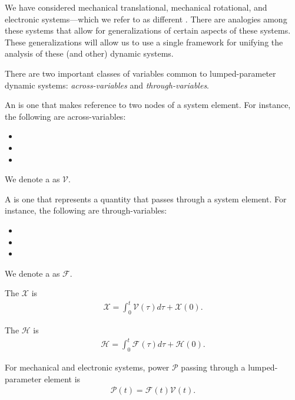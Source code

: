\documentclass[dynamic_systems.tex]{subfiles}
\begin{document}
We have considered mechanical translational, mechanical rotational, and electronic systems---which we refer to as different .
There are analogies among these systems that allow for generalizations of certain aspects of these systems.
These generalizations will allow us to use a single framework for unifying the analysis of these (and other) dynamic systems.
\tags{}

There are two important classes of variables common to lumped-parameter dynamic systems: \emph{across-variables} and \emph{through-variables}.
\tags{}

An  is one that makes reference to two nodes of a system element.
For instance, the following are across-variables:
\tags{}

\begin{itemize}
	\item {}
	\item {}
	\item {}
\end{itemize}
We denote a  as $\mathcal{V}$.

A  is one that represents a quantity that passes through a system element.
For instance, the following are through-variables:
\tags{}
\begin{itemize}
	\item {}
	\item {}
	\item {}
\end{itemize}
We denote a  as $\mathcal{F}$.

The  $\mathcal{X}$ is
\begin{align}
	\mathcal{X} = \int_0^t \mathcal{V}(\tau) d\tau + \mathcal{X}(0).
\end{align}

The  $\mathcal{H}$ is
\begin{align}
	\mathcal{H} = \int_0^t \mathcal{F}(\tau) d\tau + \mathcal{H}(0).
\end{align}

For mechanical and electronic systems, power $\mathcal{P}$ passing through a lumped-parameter element is 
\begin{align}
	\mathcal{P}(t) = \mathcal{F}(t) \mathcal{V}(t).
\end{align}
\end{document}
